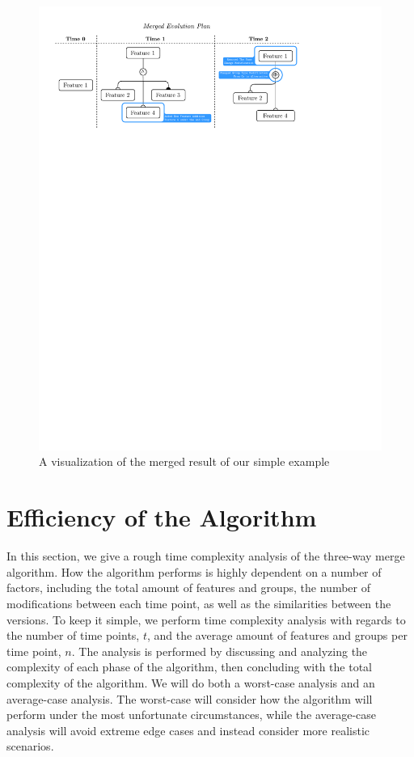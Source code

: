 \documentclass[a4paper,english]{ifimaster}
\begin{document}
\begin{figure}[htpb]
  \centering
  \includegraphics[width=\linewidth]{simple_merged_ep.pdf}
  \caption{A visualization of the merged result of our simple example}%
  \label{fig:simple_three_way_merged_result}
\end{figure}

\section{Efficiency of the Algorithm}%
\label{sec:efficiency_of_the_algorithm}

In this section, we give a rough time complexity analysis of the three-way merge algorithm. How the algorithm performs is highly dependent on a number of factors, including the total amount of features and groups, the number of modifications between each time point, as well as the similarities between the versions. To keep it simple, we perform time complexity analysis with regards to the number of time points, $t$, and the average amount of features and groups per time point, $n$. The analysis is performed by discussing and analyzing the complexity of each phase of the algorithm, then concluding with the total complexity of the algorithm. We will do both a worst-case analysis and an average-case analysis. The worst-case will consider how the algorithm will perform under the most unfortunate circumstances, while the average-case analysis will avoid extreme edge cases and instead consider more realistic scenarios.
\end{document}
